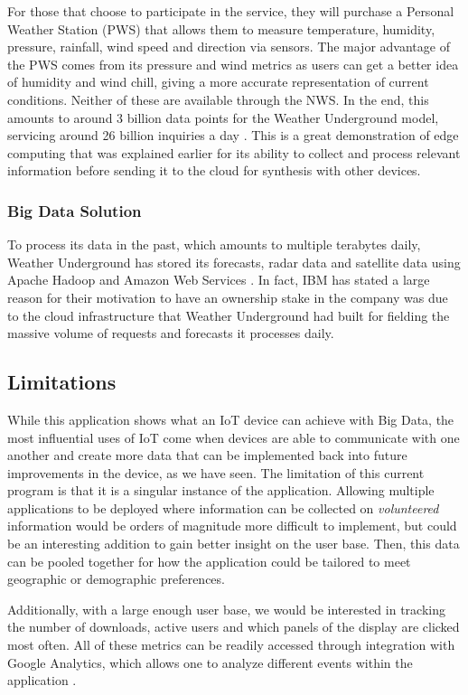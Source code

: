 \documentclass[sigconf]{acmart}
\begin{document}
For those that choose to participate in the service, they will purchase a Personal Weather Station (PWS) that allows them to measure temperature, humidity, pressure, rainfall, wind speed and direction via sensors. The major advantage of the PWS comes from its pressure and wind metrics as users can get a better idea of humidity and wind chill, giving a more accurate representation of current conditions. Neither of these are available through the NWS. In the end, this amounts to around 3 billion data points for the Weather Underground model, servicing around 26 billion inquiries a day \cite{ibm}. This is a great demonstration of edge computing that was explained earlier for its ability to collect and process relevant information before sending it to the cloud for synthesis with other devices. 

\subsubsection{Big Data Solution}
To process its data in the past, which amounts to multiple terabytes daily, Weather Underground has stored its forecasts, radar data and satellite data using Apache Hadoop and Amazon Web Services \cite{wuinf}. In fact, IBM has stated a large reason for their motivation to have an ownership stake in the company was due to the cloud infrastructure that Weather Underground had built for fielding the massive volume of requests and forecasts it processes daily.  

\subsection{Limitations}

While this application shows what an IoT device can achieve with Big Data, the most influential uses of IoT come when devices are able to communicate with one another and create more data that can be implemented back into future improvements in the device, as we have seen. The limitation of this current program is that it is a singular instance of the application. Allowing multiple applications to be deployed where information can be collected on \emph{volunteered} information would be orders of magnitude more difficult to implement, but could be an interesting addition to gain better insight on the user base. Then, this data can be pooled together for how the application could be tailored to meet geographic or demographic preferences.

Additionally, with a large enough user base, we would be interested in tracking the number of downloads, active users and which panels of the display are clicked most often. All of these metrics can be readily accessed through integration with Google Analytics, which allows one to analyze different events within the application \cite{googleanalytics}.
\end{document}

